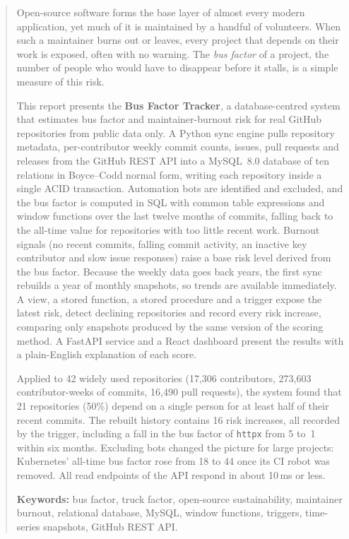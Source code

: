 \documentclass[11pt,a4paper]{report}
\begin{document}
\begin{abstract}
\noindent
Open-source software forms the base layer of almost every modern application,
yet much of it is maintained by a handful of volunteers. When such a maintainer
burns out or leaves, every project that depends on their work is exposed, often
with no warning. The \emph{bus factor} of a project, the number of people who
would have to disappear before it stalls, is a simple measure of this risk.

This report presents the \textbf{Bus Factor Tracker}, a database-centred system
that estimates bus factor and maintainer-burnout risk for real GitHub
repositories from public data only. A Python sync engine pulls repository
metadata, per-contributor weekly commit counts, issues, pull requests and
releases from the GitHub REST API into a MySQL~8.0 database of ten relations in
Boyce--Codd normal form, writing each repository inside a single ACID
transaction. Automation bots are identified and excluded, and the bus factor is
computed in SQL with common table expressions and window functions over the
last twelve months of commits, falling back to the all-time value for
repositories with too little recent work. Burnout signals (no recent commits,
falling commit activity, an inactive key contributor and slow issue responses)
raise a base risk level derived from the bus factor. Because the weekly data
goes back years, the first sync rebuilds a year of monthly snapshots, so trends
are available immediately. A view, a stored function, a stored procedure and a
trigger expose the latest risk, detect declining repositories and record every
risk increase, comparing only snapshots produced by the same version of the
scoring method. A FastAPI service and a React dashboard present the results
with a plain-English explanation of each score.

Applied to 42 widely used repositories (17,306 contributors, 273,603
contributor-weeks of commits, 16,490 pull requests), the system found that 21
repositories (50\%) depend on a single person for at least half of their
recent commits. The rebuilt history contains 16 risk increases, all recorded by
the trigger, including a fall in the bus factor of \texttt{httpx} from 5 to~1
within six months. Excluding bots changed the picture for large projects:
Kubernetes' all-time bus factor rose from 18 to 44 once its CI robot was
removed. All read endpoints of the API respond in about 10\,ms or less.

\vspace{0.6em}
\noindent\textbf{Keywords:} bus factor, truck factor, open-source sustainability,
maintainer burnout, relational database, MySQL, window functions, triggers,
time-series snapshots, GitHub REST API.
\end{abstract}
\end{document}
